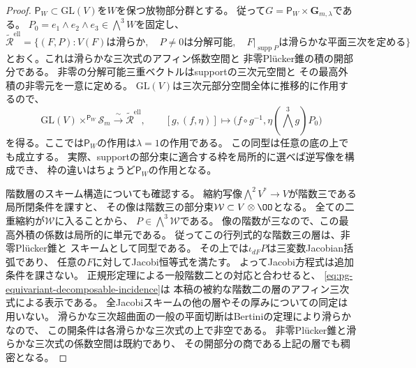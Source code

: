 \begin{proof}
$\mathsf P_W\subset\mathrm{GL}(V)$を$W$を保つ放物部分群とする。
従って$G=\mathsf P_W\times\mathbf G_{m,\lambda}$である。
$P_0=e_1\wedge e_2\wedge e_3\in\bigwedge^3W$を固定し、
\begin{equation}
 \widetilde{\mathscr R}^{\mathrm{ell}}
 =\{(F,P):V(F)\text{は滑らか},\quad
 P\ne0\text{は分解可能},\quad
 F|_{\operatorname{supp}P}\text{は滑らかな平面三次を定める}\}
 \label{eq:pg-equivariant-decomposable-incidence}
\end{equation}
とおく。これは滑らかな三次式のアフィン係数空間と
非零Pl\"ucker錐の積の開部分である。
非零の分解可能三重ベクトルはsupportの三次元空間と
その最高外積の非零元を一意に定める。
$\mathrm{GL}(V)$は三次元部分空間全体に推移的に作用するので、
\begin{equation}
 \mathrm{GL}(V)\times^{\mathsf P_W}\mathscr S_m
 \xrightarrow{\ \sim\ }\widetilde{\mathscr R}^{\mathrm{ell}},\qquad
 [g,(f,\eta)]\longmapsto
 \bigl(f\circ g^{-1},\eta(\bigwedge^3g)P_0\bigr)
 \label{eq:pg-equivariant-associated-incidence}
\end{equation}
を得る。ここでは$\mathsf P_W$の作用は$\lambda=1$の作用である。
この同型は任意の底の上でも成立する。
実際、supportの部分束に適合する枠を局所的に選べば逆写像を構成でき、
枠の違いはちょうど$\mathsf P_W$の作用となる。

階数層のスキーム構造についても確認する。
縮約写像$\bigwedge^2V^*\to V$が階数三である局所閉条件を課すと、
その像は階数三の部分束$\mathcal W\subset V\otimes\OO$となる。
全ての二重縮約が$\mathcal W$に入ることから、
$P\in\bigwedge^3\mathcal W$である。
像の階数が三なので、この最高外積の係数は局所的に単元である。
従ってこの行列式的な階数三の層は、非零Pl\"ucker錐と
スキームとして同型である。
その上では$\iota_{dF}P$は三変数Jacobian括弧であり、
任意の$F$に対してJacobi恒等式を満たす。
よってJacobi方程式は追加条件を課さない。
正規形定理による一般階数二との対応と合わせると、
\eqref{eq:pg-equivariant-decomposable-incidence}は
本稿の被約な階数二の層のアフィン三次式による表示である。
全Jacobiスキームの他の層やその厚みについての同定は用いない。
滑らかな三次超曲面の一般の平面切断はBertiniの定理により滑らかなので、
この開条件は各滑らかな三次式の上で非空である。
非零Pl\"ucker錐と滑らかな三次式の係数空間は既約であり、
その開部分の商である上記の層でも稠密となる。


\end{proof}

